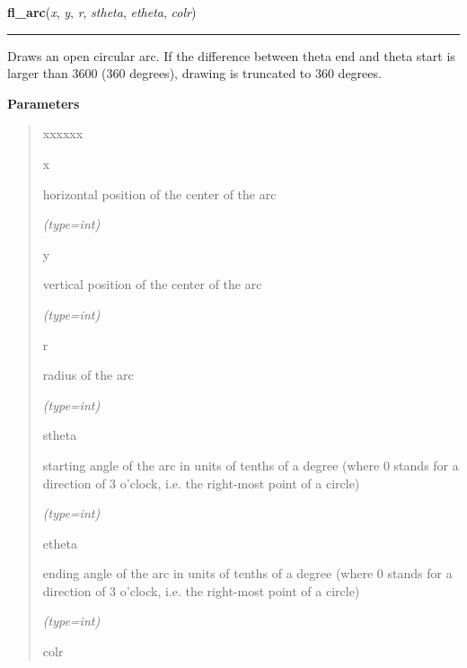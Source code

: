 \hspace{.8\funcindent}\begin{boxedminipage}{\funcwidth}

    \raggedright \textbf{fl\_arc}(\textit{x}, \textit{y}, \textit{r}, \textit{stheta}, \textit{etheta}, \textit{colr})

    \vspace{-1.5ex}

    \rule{\textwidth}{0.5\fboxrule}
\setlength{\parskip}{2ex}
    Draws an open circular arc. If the difference between theta end and 
    theta start is larger than 3600 (360 degrees), drawing is truncated to 
    360 degrees.

\setlength{\parskip}{1ex}
      \textbf{Parameters}
      \vspace{-1ex}

      \begin{quote}
        \begin{Ventry}{xxxxxx}

          \item[x]

          horizontal position of the center of the arc

            {\it (type=int)}

          \item[y]

          vertical position of the center of the arc

            {\it (type=int)}

          \item[r]

          radius of the arc

            {\it (type=int)}

          \item[stheta]

          starting angle of the arc in units of tenths of a degree (where 0
          stands for a direction of 3 o'clock, i.e. the right-most point of
          a circle)

            {\it (type=int)}

          \item[etheta]

          ending angle of the arc in units of tenths of a degree (where 0 
          stands for a direction of 3 o'clock, i.e. the right-most point of
          a circle)

            {\it (type=int)}

          \item[colr]


\end{Ventry}
\end{quote}
\end{boxedminipage}

